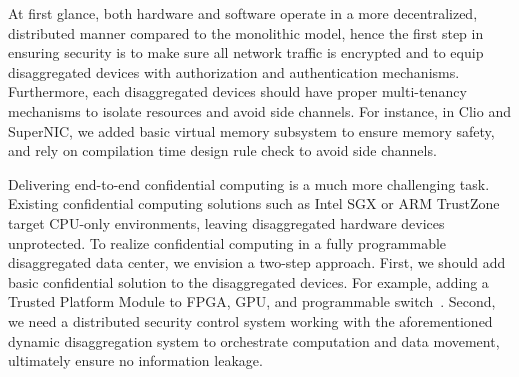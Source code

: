 At first glance,
both hardware and software operate in a more decentralized, distributed manner
compared to the monolithic model, hence the first step in ensuring security is to make sure
all network traffic is encrypted and to equip disaggregated devices
with authorization and authentication mechanisms.
Furthermore, each disaggregated devices should have proper multi-tenancy mechanisms 
to isolate resources and avoid side channels.
For instance, in Clio and SuperNIC, we added basic virtual memory subsystem to ensure memory safety,
and rely on compilation time design rule check to avoid side channels.

Delivering end-to-end confidential computing is a much more challenging task.
Existing confidential computing solutions such as Intel
SGX or ARM TrustZone target CPU-only environments,
leaving disaggregated hardware devices unprotected.
To realize confidential computing in a fully programmable disaggregated data center,
we envision a two-step approach.
First, we should add basic confidential solution to the disaggregated devices.
For example, adding a Trusted Platform Module to FPGA, GPU, and programmable switch~\cite{AccGuard,Telekine}.
Second, we need a distributed security control system working with the
aforementioned dynamic disaggregation system to orchestrate computation and data movement,
ultimately ensure no information leakage.